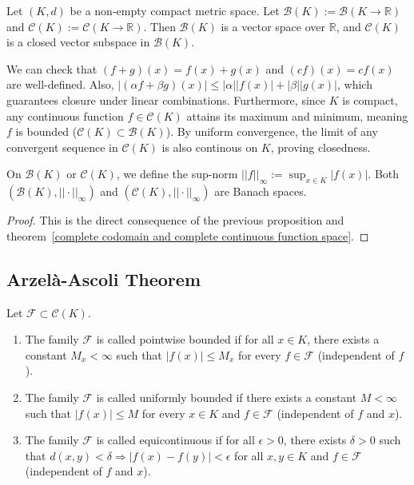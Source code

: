 \begin{proposition}
Let $(K, d)$ be a non-empty compact metric space. Let $\mathcal{B}(K) := \mathcal{B}(K \rightarrow \mathbb{R})$ and $\mathcal{C}(K) := \mathcal{C}(K \rightarrow \mathbb{R})$. Then $\mathcal{B}(K)$ is a vector space over $\mathbb{R}$, and $\mathcal{C}(K)$ is a closed vector subspace in $\mathcal{B}(K)$.
\end{proposition}
\begin{pfbox}
We can check that $(f+g)(x) = f(x) + g(x)$ and $(cf)(x) = cf(x)$ are well-defined. Also, $|(\alpha f + \beta g)(x)| \le |\alpha||f(x)| + |\beta||g(x)|$, which guarantees closure under linear combinations. Furthermore, since $K$ is compact, any continuous function $f \in \mathcal{C}(K)$ attains its maximum and minimum, meaning $f$ is bounded ($\mathcal{C}(K) \subset \mathcal{B}(K)$). 
By uniform convergence, the limit of any convergent sequence in $\mathcal{C}(K)$ is also continous on $K$, proving closedness.
\end{pfbox}


\begin{theorem}
On $\mathcal{B}(K)$ or $\mathcal{C}(K)$, we define the sup-norm $||f||_\infty := \displaystyle\sup_{x \in K} |f(x)|$. Both $(\mathcal{B}(K), ||\cdot||_\infty)$ and $(\mathcal{C}(K), ||\cdot||_\infty)$ are Banach spaces.
\end{theorem}
\begin{proof}
This is the direct consequence of the previous proposition and theorem~\eqref{complete codomain and complete continuous function space}.
\end{proof}

\subsection{Arzelà-Ascoli Theorem}

\begin{definition}
Let $\mathcal{F} \subset \mathcal{C}(K)$.
\begin{enumerate}
    \item The family $\mathcal{F}$ is called pointwise bounded if for all $x \in K$, there exists a constant $M_x < \infty$ such that $|f(x)| \le M_x$ for every $f \in \mathcal{F}$ (independent of $f$).
    \item The family $\mathcal{F}$ is called uniformly bounded if there exists a constant $M < \infty$ such that $|f(x)| \le M$ for every $x \in K$ and $f \in \mathcal{F}$ (independent of $f$ and $x$).
    \item The family $\mathcal{F}$ is called equicontinuous if for all $\epsilon > 0$, there exists $\delta > 0$ such that $d(x,y) < \delta \Rightarrow |f(x) - f(y)| < \epsilon$ for all $x, y \in K$ and $f \in \mathcal{F}$ (independent of $f$ and $x$).
\end{enumerate}
\end{definition}

